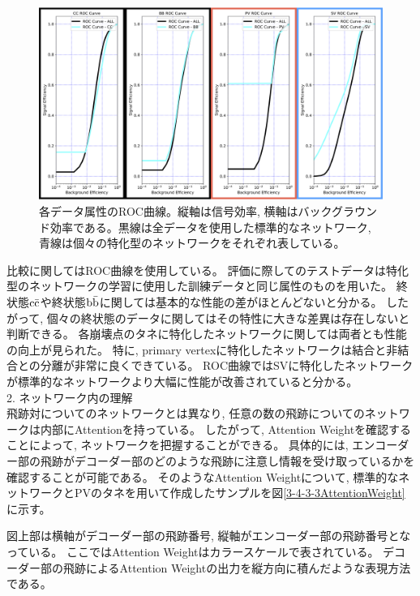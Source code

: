 \begin{figure}[htbp]
 \centering
 \includegraphics[width=1.0\textwidth, clip]{Figure/3Networks/3-4-3-2ROCCurve.png}
 \caption[各データ属性のROC曲線]{各データ属性のROC曲線。縦軸は信号効率, 横軸はバックグラウンド効率である。黒線は全データを使用した標準的なネットワーク, 青線は個々の特化型のネットワークをそれぞれ表している。}
 \label{3-4-3-2ROCCurve}
\end{figure}

比較に関してはROC曲線を使用している。
評価に際してのテストデータは特化型のネットワークの学習に使用した訓練データと同じ属性のものを用いた。
終状態$\rm c\bar{c}$や終状態$\rm b\bar{b}$に関しては基本的な性能の差がほとんどないと分かる。
したがって, 個々の終状態のデータに関してはその特性に大きな差異は存在しないと判断できる。
各崩壊点のタネに特化したネットワークに関しては両者とも性能の向上が見られた。
特に, primary vertexに特化したネットワークは結合と非結合との分離が非常に良くできている。
ROC曲線ではSVに特化したネットワークが標準的なネットワークより大幅に性能が改善されていると分かる。\\

2. ネットワーク内の理解\\

飛跡対についてのネットワークとは異なり, 任意の数の飛跡についてのネットワークは内部にAttentionを持っている。
したがって, Attention Weightを確認することによって, ネットワークを把握することができる。
具体的には, エンコーダー部の飛跡がデコーダー部のどのような飛跡に注意し情報を受け取っているかを確認することが可能である。
そのようなAttention Weightについて, 標準的なネットワークとPVのタネを用いて作成したサンプルを図\ref{3-4-3-3AttentionWeight}に示す。

図上部は横軸がデコーダー部の飛跡番号, 縦軸がエンコーダー部の飛跡番号となっている。
ここではAttention Weightはカラースケールで表されている。
デコーダー部の飛跡によるAttention Weightの出力を縦方向に積んだような表現方法である。

